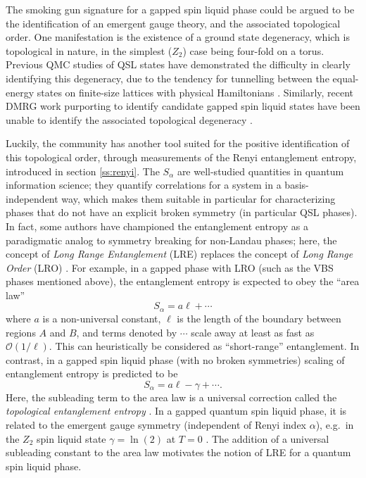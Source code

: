 \documentclass[range]{ar2e}
\begin{document}
The smoking gun signature for a gapped spin liquid phase could be argued to be the identification of an emergent gauge theory,
and the associated topological order.  One manifestation is the existence of a ground state degeneracy, which is topological in nature, in the simplest ($Z_2$) case being four-fold on a torus.  Previous QMC studies of QSL states have demonstrated the difficulty in clearly identifying this degeneracy, due to the tendency for tunnelling between the equal-energy states on finite-size lattices with physical Hamiltonians \cite{Isakov1}.  Similarly, recent DMRG work purporting to identify candidate gapped spin liquid states have been unable to identify the associated topological degeneracy \cite{Yan,J1J2}.

Luckily, the community has another tool suited for the positive identification of this topological order, through measurements of the Renyi entanglement entropy, introduced in section \ref{ss:renyi}.  The $S_{\alpha}$ are well-studied quantities in quantum information science; they quantify correlations for a system in a basis-independent way, which makes them suitable in particular for characterizing phases that do not have an explicit broken symmetry (in particular QSL phases).  In fact, some authors have championed the entanglement entropy as a paradigmatic analog to symmetry breaking for non-Landau phases; here, the concept of {\it Long Range Entanglement} (LRE) replaces the concept of {\it Long Range Order} (LRO) \cite{Wenbook}.  For example, in a gapped phase with LRO (such as the VBS phases mentioned above),
the entanglement entropy is expected to obey the ``area law''
\begin{equation} 
S_{\alpha} = a\ell + \cdots
\end{equation}
where $a$ is a non-universal constant, $\ell$ is the length of the boundary between regions $A$ and $B$, and terms denoted by $\cdots$ scale away at least as fast as $\mathcal{O} (1/\ell)$.  This can heuristically be considered as ``short-range'' entanglement.  In contrast, in a gapped spin liquid phase (with no broken symmetries)
scaling of entanglement entropy is predicted to be
\begin{equation}
S_{\alpha} = a \ell - \gamma + \cdots \label{areaL}.
\end{equation}
 Here, the subleading term to the area law is a universal correction called the {\it topological entanglement entropy} \cite{Alioscia1,Alioscia2,LW,KP}.  In a gapped quantum spin liquid phase, it is related to the emergent gauge symmetry (independent \cite{Flammia} of Renyi index $\alpha$), e.g.~in the $Z_2$ spin liquid state $\gamma =  \ln(2)$ at $T=0$ \cite{LW}.   The addition of a universal subleading constant to the area law motivates the notion of LRE for a quantum spin liquid phase.
\end{document}
